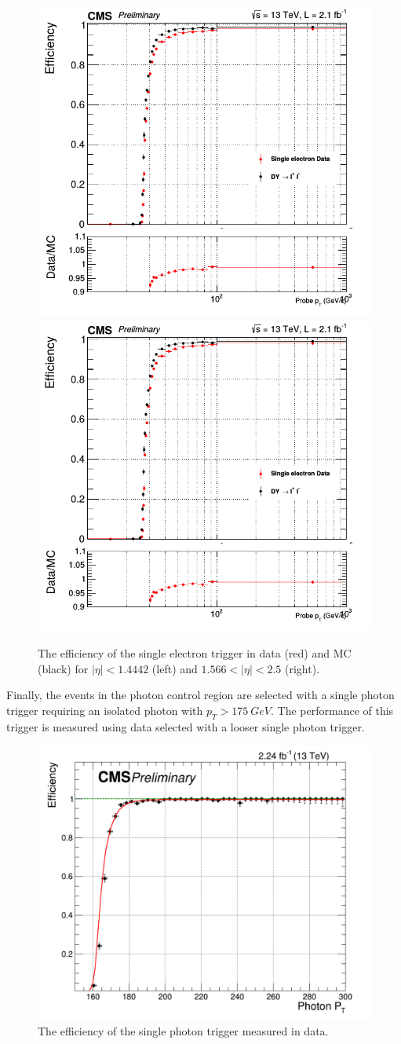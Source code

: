 \begin{figure}[ht]
  \centering
 \includegraphics[width=.49\textwidth]{monojet_etrigger_1.png} 
 \includegraphics[width=.49\textwidth]{monojet_etrigger_1.png} 
 \caption{The efficiency of the single electron trigger in data (red) and MC (black) for $|\eta| < 1.4442$ (left) and $1.566 < |\eta| < 2.5$ (right).}
 \label{fig:trigger_eff_e}
\end{figure}

Finally, the events in the photon control region are selected with a single photon trigger requiring an isolated photon with $p_T > \SI{175}{GeV}$. The performance of this trigger is measured using data selected with a looser single photon trigger.

\begin{figure}[ht]
  \centering
 \includegraphics[width=.6\textwidth]{monojet_gammatrigger.png} 
 \caption{The efficiency of the single photon trigger measured in data.}
 \label{fig:trigger_eff_gamma}
\end{figure}

